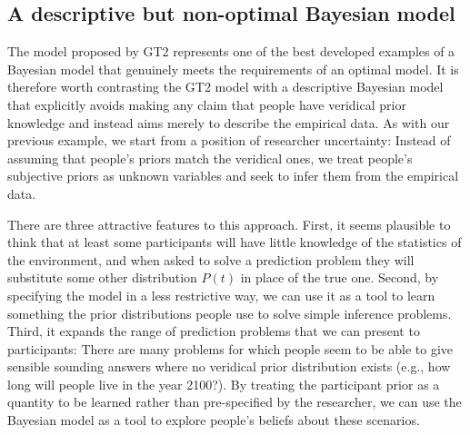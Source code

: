 \subsection*{A descriptive but non-optimal Bayesian model}

The model proposed by GT2 represents one of the best developed examples of a Bayesian model that genuinely meets the requirements of an optimal model. It is therefore worth contrasting the GT2 model with a descriptive Bayesian model that explicitly avoids making any claim that people have veridical prior knowledge and instead aims merely to describe the empirical data. As with our previous example, we start from a position of researcher uncertainty: Instead of assuming that people's priors match the veridical ones, we treat people's subjective priors as unknown variables and seek to infer them from the empirical data.  

There are three attractive features to this approach. First, it seems plausible to think that at least some participants will have little knowledge of the statistics of the environment, and when asked to solve a prediction problem they will substitute some other distribution $P(t)$ in place of the true one. Second, by specifying the model in a less restrictive way, we can use it as a tool to learn something the prior distributions people use to solve simple inference problems.  Third, it expands the range of prediction problems that we can present to participants: There are many problems for which people seem to be able to give sensible sounding answers where no veridical prior distribution exists (e.g., how long will people live in the year 2100?). By treating the participant prior as a quantity to be learned rather than pre-specified by the researcher, we can use the Bayesian model as a tool to explore people's beliefs about these scenarios. 

